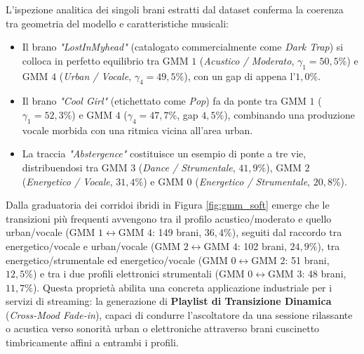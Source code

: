 L'ispezione analitica dei singoli brani estratti dal dataset conferma la coerenza tra geometria del modello e caratteristiche musicali:
\begin{itemize}
    \item Il brano \textit{"LostInMyhead"} (catalogato commercialmente come \textit{Dark Trap}) si colloca in perfetto equilibrio tra $\text{GMM } 1$ (\textit{Acustico / Moderato}, $\gamma_1 = 50,5\%$) e $\text{GMM } 4$ (\textit{Urban / Vocale}, $\gamma_4 = 49,5\%$), con un gap di appena l'$1,0\%$.
    \item Il brano \textit{"Cool Girl"} (etichettato come \textit{Pop}) fa da ponte tra $\text{GMM } 1$ ($\gamma_1 = 52,3\%$) e $\text{GMM } 4$ ($\gamma_4 = 47,7\%$, gap $4,5\%$), combinando una produzione vocale morbida con una ritmica vicina all'area urban.
    \item La traccia \textit{"Abstergence"} costituisce un esempio di ponte a tre vie, distribuendosi tra $\text{GMM } 3$ (\textit{Dance / Strumentale}, $41,9\%$), $\text{GMM } 2$ (\textit{Energetico / Vocale}, $31,4\%$) e $\text{GMM } 0$ (\textit{Energetico / Strumentale}, $20,8\%$).
\end{itemize}

Dalla graduatoria dei corridoi ibridi in Figura \ref{fig:gmm_soft} emerge che le transizioni più frequenti avvengono tra il profilo acustico/moderato e quello urban/vocale ($\text{GMM } 1 \leftrightarrow \text{GMM } 4$: 149 brani, $36,4\%$), seguiti dal raccordo tra energetico/vocale e urban/vocale ($\text{GMM } 2 \leftrightarrow \text{GMM } 4$: 102 brani, $24,9\%$), tra energetico/strumentale ed energetico/vocale ($\text{GMM } 0 \leftrightarrow \text{GMM } 2$: 51 brani, $12,5\%$) e tra i due profili elettronici strumentali ($\text{GMM } 0 \leftrightarrow \text{GMM } 3$: 48 brani, $11,7\%$). Questa proprietà abilita una concreta applicazione industriale per i servizi di streaming: la generazione di \textbf{Playlist di Transizione Dinamica} (\textit{Cross-Mood Fade-in}), capaci di condurre l'ascoltatore da una sessione rilassante o acustica verso sonorità urban o elettroniche attraverso brani cuscinetto timbricamente affini a entrambi i profili.

